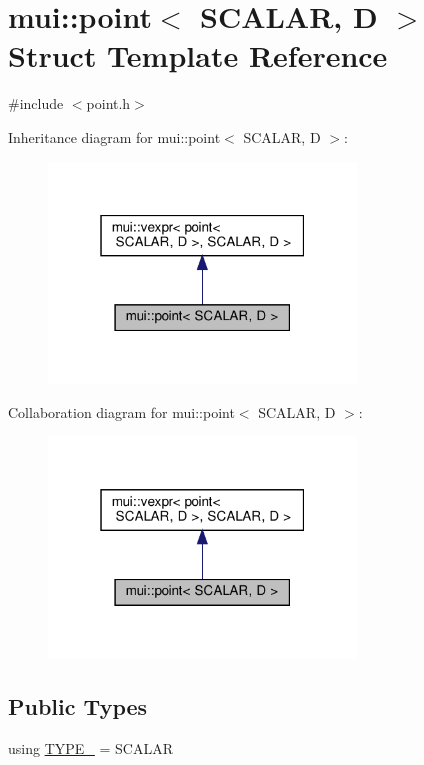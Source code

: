 \hypertarget{structmui_1_1point}{}\section{mui\+:\+:point$<$ S\+C\+A\+L\+AR, D $>$ Struct Template Reference}
\label{structmui_1_1point}


{\ttfamily \#include $<$point.\+h$>$}



Inheritance diagram for mui\+:\+:point$<$ S\+C\+A\+L\+AR, D $>$\+:
\nopagebreak
\begin{figure}[H]
\begin{center}
\leavevmode
\includegraphics[width=232pt]{structmui_1_1point__inherit__graph}
\end{center}
\end{figure}


Collaboration diagram for mui\+:\+:point$<$ S\+C\+A\+L\+AR, D $>$\+:
\nopagebreak
\begin{figure}[H]
\begin{center}
\leavevmode
\includegraphics[width=232pt]{structmui_1_1point__coll__graph}
\end{center}
\end{figure}
\subsection*{Public Types}
\begin{DoxyCompactItemize}
\item 
using \hyperlink{structmui_1_1point_a5d9eeaa8bfdd3be725481b658ef81f58}{T\+Y\+P\+E\+\_\+} = S\+C\+A\+L\+AR
\end{DoxyCompactItemize}
